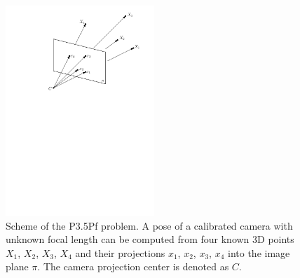\begin{figure}[ht]
  \centering
  \includegraphics[width=0.5\textwidth]{drawings/P35Pf.pdf}
  \caption{Scheme of the P3.5Pf problem. A pose of a calibrated camera with unknown focal length can be computed from four known 3D points $X_1$, $X_2$, $X_3$, $X_4$ and their projections $x_1$, $x_2$, $x_3$, $x_4$ into the image plane $\pi$. The camera projection center is denoted as $C$.}
\end{figure}


